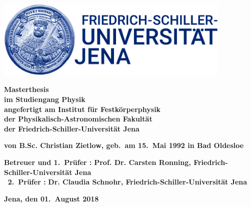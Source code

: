
\thispagestyle{empty}
\begin{center}
\vspace*{-2cm}
\includegraphics[width=0.85\textwidth]{Bilder/Logo_FSU}\\
\vspace*{3cm}
    {\titlefont \huge \onehalfspacing
	\thetitle 
    \par}%
   \vfill
    {\normalfont\normalcolor\bfseries
	\large
	Masterthesis \\
	\large
	im Studiengang Physik\\
	angefertigt am Institut für Festkörperphysik\\
	der Physikalisch-Astronomischen Fakultät\\
	der Friedrich-Schiller-Universität Jena
    \par}%
\end{center}\par
\vspace*{2.5cm}
\noindent\begin{minipage}[b]{\textwidth}
{
  \noindent \textbf{von B.Sc. Christian Zietlow, geb.~am 15.~Mai 1992 in Bad Oldesloe}\\

  \begin{tabbing}
  \textbf{Betreuer und 1.~Pr\"ufer :}  \= \textbf{Prof. Dr. Carsten Ronning, Friedrich-Schiller-Universität Jena}\\
  \textbf{\qquad \qquad \qquad \, 2.~Pr\"ufer :} \> \textbf{Dr. Claudia Schnohr, Friedrich-Schiller-Universität Jena} \\
  \end{tabbing}

  \noindent \textbf{Jena, den  01.~August 2018}
  }
\end{minipage}


